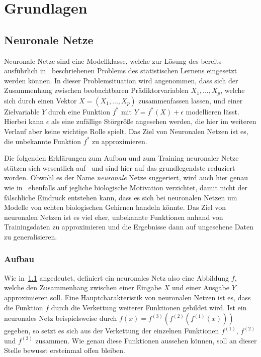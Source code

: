 \section{Grundlagen}
\label{sec:grundlagen}

\subsection{Neuronale Netze}
\label{sec:neuronale-netze}

Neuronale Netze sind eine Modellklasse, welche zur L\"osung des
bereits ausf\"uhrlich
in~\cite{statistical_learning} beschriebenen Problems des statistischen
Lernens eingesetzt werden k\"onnen.
In dieser Problemsituation wird angenommen, dass sich der Zusammenhang zwischen
beobachtbaren Pr\"adiktorvariablen $X_1, ..., X_p$, welche sich durch
einen Vektor $X = (X_1, ..., X_p)$ zusammenfassen lassen, und einer
Zielvariable $Y$ durch eine Funktion $f^*$ mit $Y = f^*(X) + \epsilon$
modellieren l\"asst. Hierbei kann $\epsilon$ als eine zuf\"allige
St\"orgr\"o{\ss}e angesehen werden, die hier im weiteren Verlauf aber
keine wichtige Rolle spielt.
Das Ziel von Neuronalen Netzen ist es, die unbekannte Funktion $f^*$
zu approximieren.

Die folgenden Erkl\"arungen zum Aufbau und zum Training neuronaler Netze
st\"utzen sich wesentlich auf~\cite{Goodfellow-et-al-2016} und sind hier
auf das grundlegendste reduziert worden.
Obwohl es der Name \textit{neuronale} Netze suggeriert, wird auch hier
genau wie in~\cite{Goodfellow-et-al-2016} ebenfalls auf jegliche
biologische Motivation verzichtet, damit nicht der f\"alschliche Eindruck
entstehen kann, dass es sich bei neuronalen Netzen um Modelle von echten
biologischen Gehirnen handeln k\"onnte.
Das Ziel von neuronalen Netzen ist es viel eher, unbekannte Funktionen
anhand von Trainingsdaten zu approximieren und die Ergebnisse dann auf
ungesehene Daten zu generalisieren.

\subsubsection{Aufbau}

Wie in~\ref{sec:neuronale-netze} angedeutet, definiert ein neuronales Netz
also eine Abbildung $f$, welche den Zusammenhang zwischen einer Eingabe $X$
und einer Ausgabe $Y$ approximieren soll.
Eine Hauptcharakteristik von neuronalen Netzen ist es, dass die Funktion $f$
durch die Verkettung weiterer Funktionen gebildet wird.
Ist ein neuronales Netz beispielsweise durch
$f(x) = f^{(3)}(f^{(2)}(f^{(1)}(x)))$ gegeben, so setzt es sich aus der
Verkettung der einzelnen Funktionen $f^{(1)}$, $f^{(2)}$ und
$f^{(3)}$ zusammen. Wie genau diese Funktionen aussehen k\"onnen, soll an dieser
Stelle bewusst ersteinmal offen bleiben.

